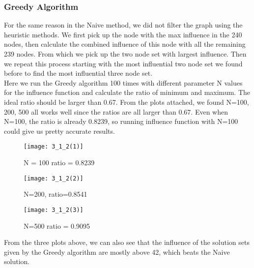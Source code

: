 \documentclass{article}
\begin{document}
\FloatBarrier
\subsubsection{Greedy Algorithm}      %
For the same reason in the Naive method, we did not filter the graph using the heuristic methods. We first pick up the node with the max influence in the 240 nodes, then calculate the combined influence of this node with all the remaining 239 nodes. From which we pick up the two node set with largest influence. Then we repeat this process starting with the most influential two node set we found before to find the most influential three node set. \\
Here we run the Greedy algorithm 100 times with different parameter N values for the influence function and calculate the ratio of minimum and maximum. The ideal ratio should be larger than 0.67. From the plots attached, we found N=100, 200, 500 all works well since the ratios are all larger than 0.67. Even when N=100, the ratio is already 0.8239, so running influence function with N=100 could give us pretty accurate results.
\begin{figure}[h]
\begin{center}
\texttt{[image: 3\_1\_2(1)]} %
\caption{N = 100  ratio = 0.8239}
\end{center}
\end{figure}

\begin{figure}[h]
\begin{center}
\texttt{[image: 3\_1\_2(2)]} %
\caption{N=200, ratio=0.8541}
\end{center}
\end{figure}

\begin{figure}[h]
\begin{center}
\texttt{[image: 3\_1\_2(3)]} %
\caption{N=500 ratio = 0.9095}
\end{center}
\end{figure}

\FloatBarrier
From the three plots above, we can also see that the influence of the solution sets given by the Greedy algorithm are mostly above 42, which beats the Naive solution.

\FloatBarrier
\end{document}
